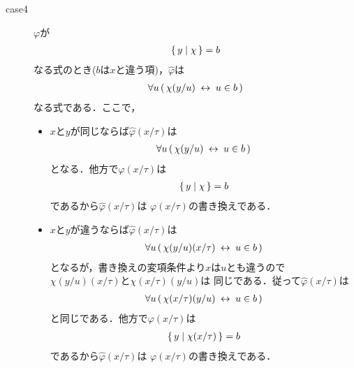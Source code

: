 \begin{metaprf}
\begin{description}
\begin{description}
					\item[case4] $\varphi$が
						\begin{align}
							\{\, y \mid \chi\, \} = b
						\end{align}
						なる式のとき($b$は$x$と違う項)，$\widehat{\varphi}$は
						\begin{align}
							\forall u\, (\, \chi(y/u) \hspace{0.25em}\leftrightarrow\hspace{0.25em} u \in b\, )
						\end{align}
						なる式である．ここで，
						\begin{itemize}
							\item $x$と$y$が同じならば$\widehat{\varphi}(x/\tau)$は
								\begin{align}
									\forall u\, (\, \chi(y/u) \hspace{0.25em}\leftrightarrow\hspace{0.25em} u \in b\, )
								\end{align}
								となる．他方で$\varphi(x/\tau)$は
								\begin{align}
									\{\, y \mid \chi\, \} = b
								\end{align}
								であるから$\widehat{\varphi}(x/\tau)$は
								$\varphi(x/\tau)$の書き換えである．
								
							\item $x$と$y$が違うならば$\widehat{\varphi}(x/\tau)$は
								\begin{align}
									\forall u\, (\, \chi(y/u)(x/\tau) \hspace{0.25em}\leftrightarrow\hspace{0.25em} u \in b\, )
								\end{align}
								となるが，書き換えの変項条件より$x$は$u$とも違うので
								$\chi(y/u)(x/\tau)$と$\chi(x/\tau)(y/u)$は
								同じである．従って$\widehat{\varphi}(x/\tau)$は
								\begin{align}
									\forall u\, (\, \chi(x/\tau)(y/u) \hspace{0.25em}\leftrightarrow\hspace{0.25em} u \in b\, )
								\end{align}
								と同じである．他方で$\varphi(x/\tau)$は
								\begin{align}
									\{\, y \mid \chi(x/\tau)\, \} = b
								\end{align}
								であるから$\widehat{\varphi}(x/\tau)$は
								$\varphi(x/\tau)$の書き換えである．
						\end{itemize}
					

\end{description}
\end{description}
\end{metaprf}
